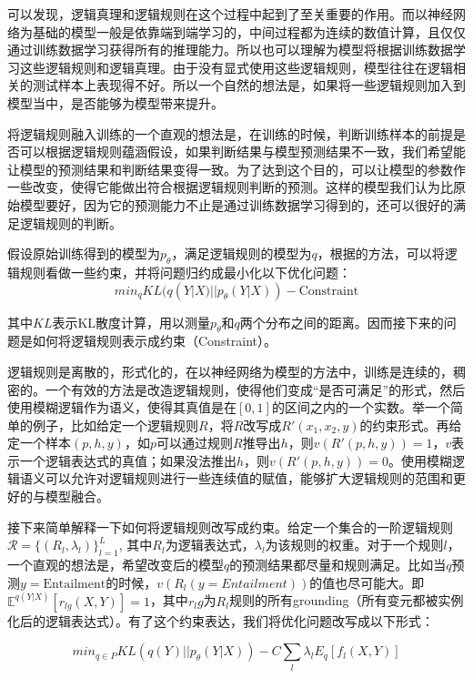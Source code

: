\documentclass[UTF8,11pt,a4paper,nofonts]{ctexart}
\numberwithin{equation}{section}
\begin{document}
可以发现，逻辑真理和逻辑规则在这个过程中起到了至关重要的作用。而以神经网络为基础的模型一般是依靠端到端学习的，中间过程都为连续的数值计算，且仅仅通过训练数据学习获得所有的推理能力。所以也可以理解为模型将根据训练数据学习这些逻辑规则和逻辑真理。由于没有显式使用这些逻辑规则，模型往往在逻辑相关的测试样本上表现得不好。所以一个自然的想法是，如果将一些逻辑规则加入到模型当中，是否能够为模型带来提升。



将逻辑规则融入训练的一个直观的想法是，在训练的时候，判断训练样本的前提是否可以根据逻辑规则蕴涵假设，如果判断结果与模型预测结果不一致，我们希望能让模型的预测结果和判断结果变得一致。为了达到这个目的，可以让模型的参数作一些改变，使得它能做出符合根据逻辑规则判断的预测。这样的模型我们认为比原始模型要好，因为它的预测能力不止是通过训练数据学习得到的，还可以很好的满足逻辑规则的判断。

假设原始训练得到的模型为$p_\theta$，满足逻辑规则的模型为$q$，根据\cite{Hu2016HarnessingDN}的方法，可以将逻辑规则看做一些约束，并将问题归约成最小化以下优化问题：
\begin{equation}
min_{q} KL(q(Y|X) || p_\theta(Y|X)) - \text{Constraint}
\end{equation}

其中$KL$表示KL散度计算，用以测量$p_\theta$和$q$两个分布之间的距离。因而接下来的问题是如何将逻辑规则表示成约束（Constraint）。

逻辑规则是离散的，形式化的，在以神经网络为模型的方法中，训练是连续的，稠密的。一个有效的方法是改造逻辑规则，使得他们变成“是否可满足”的形式，然后使用模糊逻辑作为语义，使得其真值是在$[0,1]$的区间之内的一个实数。举一个简单的例子，比如给定一个逻辑规则$R$，将$R$改写成$R'(x_1,x_2,y)$的约束形式。再给定一个样本$(p,h,y)$，如$p$可以通过规则$R$推导出$h$，则$v(R'(p,h,y))=1$，$v$表示一个逻辑表达式的真值；如果没法推出$h$，则$v(R'(p,h,y))=0$。使用模糊逻辑语义可以允许对逻辑规则进行一些连续值的赋值，能够扩大逻辑规则的范围和更好的与模型融合。

接下来简单解释一下如何将逻辑规则改写成约束。给定一个集合的一阶逻辑规则$\mathcal{R}=\{(R_l,\lambda_l)\}^L_{l=1}$, 其中$R_l$为逻辑表达式，$\lambda_l$为该规则的权重。对于一个规则$l$，一个直观的想法是，希望改变后的模型$q$的预测结果都尽量和规则满足。比如当$q$预测$y=\text{Entailment}$的时候，$v(R_l(y=Entailment))$的值也尽可能大。即$\mathbb{E}^{q(Y|X)}[r_{lg}(X,Y)]=1$，其中$r_lg$为$R_l$规则的所有grounding（所有变元都被实例化后的逻辑表达式）。有了这个约束表达，我们将优化问题改写成以下形式：

\begin{equation}
min_{q \in P} KL(q(Y)|| p_\theta(Y|X)) - C \sum_l \lambda_l E_q[f_l(X,Y)]
\end{equation}
\end{document}
